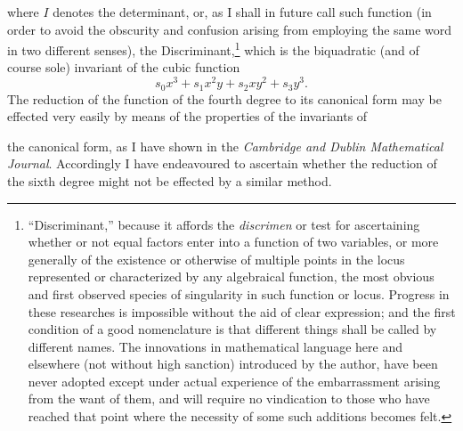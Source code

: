 \documentclass[11pt]{article}
\newcommand{\sourcepage}[1]{\marginpar{\scriptsize p.~#1}}
\begin{document}
where $I$ denotes the determinant, or, as I shall in future call such function (in order to avoid the obscurity and confusion arising from employing the same word in two different senses), the Discriminant,\footnote{``Discriminant,'' because it affords the \emph{discrimen} or test for ascertaining whether or not equal factors enter into a function of two variables, or more generally of the existence or otherwise of multiple points in the locus represented or characterized by any algebraical function, the most obvious and first observed species of singularity in such function or locus. Progress in these researches is impossible without the aid of clear expression; and the first condition of a good nomenclature is that different things shall be called by different names. The innovations in mathematical language here and elsewhere (not without high sanction) introduced by the author, have been never adopted except under actual experience of the embarrassment arising from the want of them, and will require no vindication to those who have reached that point where the necessity of some such additions becomes felt.} which is the biquadratic (and of course sole) invariant of the cubic function
\[
s_0x^3+s_1x^2y+s_2xy^2+s_3y^3.
\]
The reduction of the function of the fourth degree to its canonical form may be effected very easily by means of the properties of the invariants of

\sourcepage{281}
the canonical form, as I have shown in the \emph{Cambridge and Dublin Mathematical Journal}. Accordingly I have endeavoured to ascertain whether the reduction of the sixth degree might not be effected by a similar method.
\end{document}
